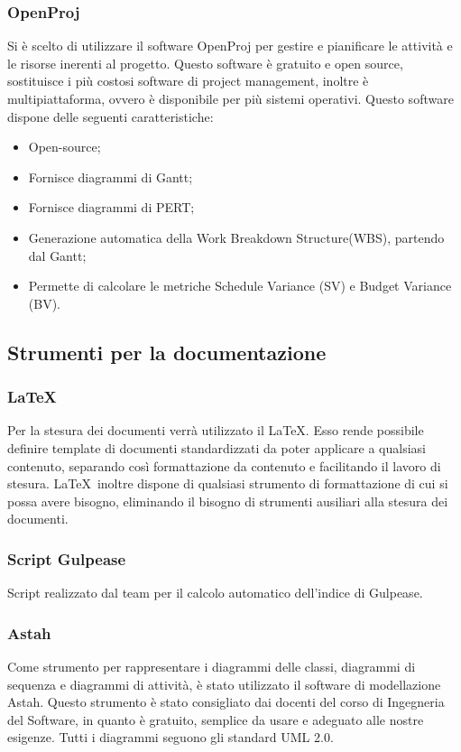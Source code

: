 \subsubsection{OpenProj}
Si è scelto di utilizzare il software OpenProj per gestire e pianificare le attività e le risorse inerenti al progetto.
Questo software è gratuito e open source, sostituisce i più costosi software di project management, inoltre è multipiattaforma, ovvero è disponibile per più sistemi operativi.
Questo software dispone delle seguenti caratteristiche:
\begin{itemize}
\item Open-source;
\item Fornisce diagrammi di Gantt;
\item Fornisce diagrammi di PERT;
\item Generazione automatica della Work Breakdown Structure(WBS), partendo dal Gantt;
\item Permette di calcolare le metriche Schedule Variance (SV) e Budget Variance (BV).
\end{itemize}
\label{}


\subsection{Strumenti per la documentazione}
\label{}
\subsubsection{LaTeX}
\label{5.7}
Per la stesura dei documenti verrà utilizzato il  \LaTeX. Esso rende possibile definire template di documenti standardizzati da poter applicare a qualsiasi contenuto, separando così formattazione da contenuto e facilitando il lavoro di stesura. \LaTeX\ inoltre dispone di qualsiasi strumento di formattazione di cui si possa avere bisogno, eliminando il bisogno di strumenti ausiliari alla stesura dei documenti.

\subsubsection{Script Gulpease}
\label{}
Script realizzato dal team per il calcolo automatico dell'indice di Gulpease.

\subsubsection{Astah}
Come strumento per rappresentare i diagrammi delle classi, diagrammi di sequenza e diagrammi di attività, è stato utilizzato il software di modellazione Astah. Questo strumento è stato consigliato dai docenti del corso di Ingegneria del Software, in quanto è gratuito, semplice da usare e adeguato alle nostre esigenze. Tutti i diagrammi seguono gli standard UML 2.0.

